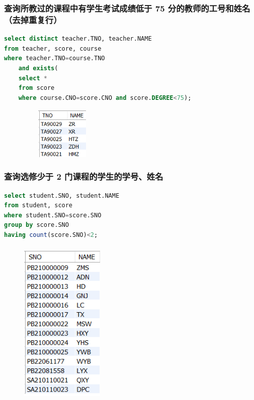 \documentclass{ctexart}
\begin{document}
\subsubsection{查询所教过的课程中有学生考试成绩低于 75 分的教师的工号和姓名（去掉重复行）}
\begin{lstlisting}[language=sql]
select distinct teacher.TNO, teacher.NAME
from teacher, score, course
where teacher.TNO=course.TNO
	and exists(
    select * 
    from score
    where course.CNO=score.CNO and score.DEGREE<75);
\end{lstlisting}
\begin{figure}[H]
	\centering 
	\includegraphics[height=2.5cm,width=4cm]{13.png}
	\end{figure}
\subsubsection{查询选修少于 2 门课程的学生的学号、姓名}
\begin{lstlisting}[language=sql]
select student.SNO, student.NAME
from student, score
where student.SNO=score.SNO 
group by score.SNO
having count(score.SNO)<2;

\end{lstlisting}
\begin{figure}[H]
	\centering 
	\includegraphics[height=8cm,width=4cm]{38.png}
	\end{figure}
\end{document}
